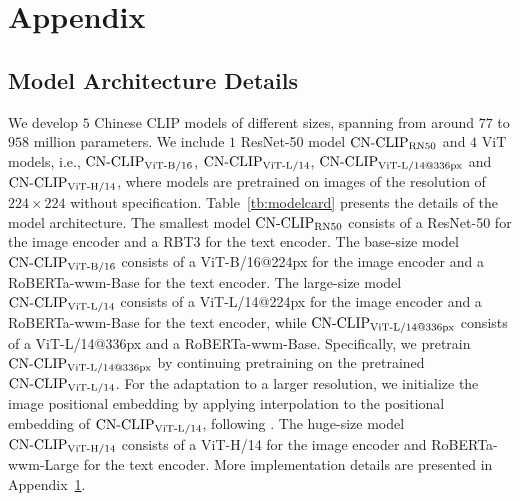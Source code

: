 \documentclass[11pt]{article}
\begin{document}



\newpage
\appendix

\section{Appendix}
\label{sec:implementation_details}

\subsection{Model Architecture Details}
\label{subsec:model_hyperparams}


We develop $5$ Chinese CLIP models of different sizes, spanning from around $77$ to $958$ million parameters. 
We include $1$ ResNet-50 model $\text{CN-CLIP}\rm_{RN50}$ and $4$ ViT models, i.e., $\text{CN-CLIP}\rm_{ViT\text{-}B/16}$, $\text{CN-CLIP}\rm_{ViT\text{-}L/14}$, $\text{CN-CLIP}\rm_{ViT\text{-}L/14@336px}$ and $\text{CN-CLIP}\rm_{ViT\text{-}H/14}$, where models are pretrained on images of the resolution of $224 \times 224$ without specification. 
Table~\ref{tb:modelcard} presents the details of the model architecture. 
The smallest model $\text{CN-CLIP}\rm_{RN50}$ consists of a ResNet-50 for the image encoder and a RBT3 for the text encoder. 
The base-size model $\text{CN-CLIP}\rm_{ViT\text{-}B/16}$ consists of a ViT-B/16@224px for the image encoder and a RoBERTa-wwm-Base for the text encoder. 
The large-size model $\text{CN-CLIP}\rm_{ViT\text{-}L/14}$ consists of a ViT-L/14@224px for the image encoder and a RoBERTa-wwm-Base for the text encoder, while $\text{CN-CLIP}\rm_{ViT\text{-}L/14@336px}$ consists of a ViT-L/14@336px and a RoBERTa-wwm-Base. 
Specifically, we pretrain $\text{CN-CLIP}\rm_{ViT\text{-}L/14@336px}$ by continuing pretraining on the pretrained $\text{CN-CLIP}\rm_{ViT\text{-}L/14}$. 
For the adaptation to a larger resolution, we initialize the image positional embedding by applying interpolation to the positional embedding of $\text{CN-CLIP}\rm_{ViT\text{-}L/14}$, following \citet{openclip}. 
The huge-size model $\text{CN-CLIP}\rm_{ViT\text{-}H/14}$ consists of a ViT-H/14 for the image encoder and RoBERTa-wwm-Large for the text encoder. 
More implementation details are presented in Appendix~\ref{sec:implementation_details}.
\end{document}
